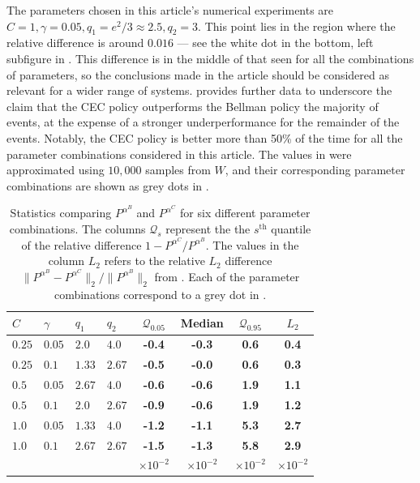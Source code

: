 \documentclass[main.tex]{subfiles}
\begin{document}
The parameters chosen in this article's numerical experiments
are $C=1,\gamma=0.05,q_1=e^2/3\approx2.5,q_2=3$. This point lies
in the region where the relative difference is around $0.016$ --- see the
white dot in the
bottom, left subfigure in .
This difference is in the middle of that seen for all the
combinations of parameters, so the conclusions made in the article
should be considered as relevant for a wider range of systems.
 provides further data to underscore
the claim that the CEC policy
outperforms the Bellman policy the
majority of events, at the expense of a stronger underperformance
for the remainder of the events. Notably, the CEC policy is better
more than 50\% of the time for all the parameter
combinations considered in this article. The values in
 were approximated using $10,000$ samples
from $W$, and their corresponding parameter combinations are shown as
grey dots in .

\begin{table}[htbp]
  \centering
  \begin{tabular}{llllcccc}
    $C$ & $\gamma$ & $q_1$ & $q_2$ & $\mathcal Q_{0.05}$
    &Median & $\mathcal Q_{0.95}$ &$L_2$\\
    \toprule
    $0.25$ & $0.05$ & $2.0$ & $4.0$  & \textbf{-0.4} & \textbf{-0.3} & \textbf{0.6} & \textbf{0.4}\\
    $0.25$ & $0.1$ & $1.33$ & $2.67$ & \textbf{-0.5} & \textbf{-0.0} & \textbf{0.6} & \textbf{0.3}\\
    $0.5$ & $0.05$ & $2.67$ & $4.0$  & \textbf{-0.6} & \textbf{-0.6} & \textbf{1.9} & \textbf{1.1}\\
    $0.5$ & $0.1$ & $2.0$ & $2.67$   & \textbf{-0.9} & \textbf{-0.6} & \textbf{1.9} & \textbf{1.2}\\
    $1.0$ & $0.05$ & $1.33$ & $4.0$  & \textbf{-1.2} & \textbf{-1.1} & \textbf{5.3} & \textbf{2.7}\\
    $1.0$ & $0.1$ & $2.67$ & $2.67$  & \textbf{-1.5} & \textbf{-1.3} & \textbf{5.8} & \textbf{2.9}\\
    &&&&$\times 10^{-2}$&$\times 10^{-2}$&$\times 10^{-2}$&$\times 10^{-2}$\\
    \bottomrule
  \end{tabular}
  \caption{Statistics comparing $P^{\alpha^B}$ and $P^{\alpha^C}$ for six different
    parameter combinations. The columns $\mathcal Q_s$ represent the
    the $s^{\text{th}}$ quantile of the relative
    difference
    $1-P^{\alpha^C}/P^{\alpha^B}$. %
    The values in the column $L_2$ refers to the relative $L_2$
    difference $\|P^{\alpha^B}-P^{\alpha^C}\|_2/\|P^{\alpha^B}\|_2$
    from . Each of the parameter
    combinations correspond to a grey dot in .
  }\label{tbl:paramcomparisons}
\end{table}
\biblio
\end{document}
